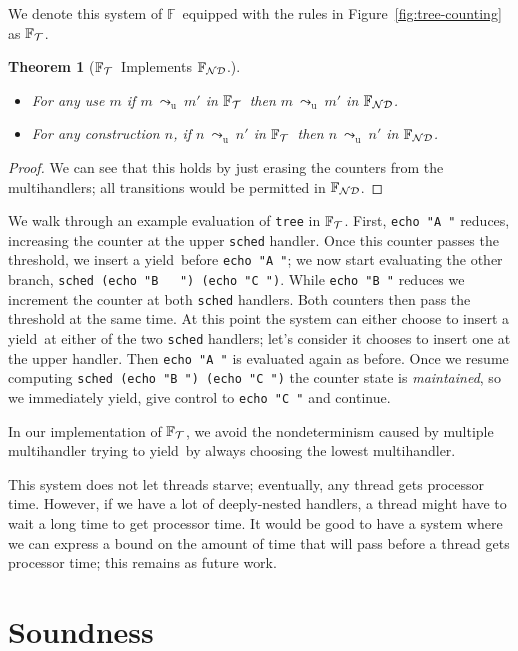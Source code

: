 \documentclass[msc,deptreport,cs]{infthesis} %
\newtheorem{theorem}{Theorem}
\newcommand{\code}[1]{\lstinline{#1}}
\newcommand\nondetfrank{$\mathbb{F}_{\cal{ND}}$}
\newcommand\treefrank{$\mathbb{F}_{\cal{T}}$}
\newcommand\purefrank{$\mathbb{F}$}
\newcommand\yield{\textsf{yield}\xspace}
\newcommand{\redtou}{\leadsto_{\mathrm{u}}}
\begin{document}
We denote this system of \purefrank~equipped with the rules in
Figure~\ref{fig:tree-counting} as \treefrank.

\begin{theorem}[\treefrank~Implements \nondetfrank.]~
\begin{itemize}
\item For any use $m$ if $m~\redtou~m'$ in \treefrank~then $m~\redtou~m'$ in
  \nondetfrank.
\item For any construction $n$, if $n~\redtou~n'$ in \treefrank~then
  $n~\redtou~n'$ in \nondetfrank.
\end{itemize}
\end{theorem}
\begin{proof}
  We can see that this holds by just erasing the counters from the
  multihandlers; all transitions would be permitted in \nondetfrank.
\end{proof}

We walk through an example evaluation of \code{tree} in \treefrank. First,
\code{echo "A "} reduces, increasing the counter at the upper \code{sched}
handler. Once this counter passes the threshold, we insert a \yield~before
\code{echo "A "}; we now start evaluating the other branch, \code{sched (echo "B
  ") (echo "C ")}. While \code{echo "B "} reduces we increment the counter at
both \code{sched} handlers. Both counters then pass the threshold at the same
time. At this point the system can either choose to insert a \yield~at either of
the two \code{sched} handlers; let's consider it chooses to insert one at the
upper handler. Then \code{echo "A "} is evaluated again as before. Once we
resume computing \code{sched (echo "B ") (echo "C ")} the counter state is
\emph{maintained}, so we immediately \yield, give control to \code{echo "C "}
and continue.

In our implementation of \treefrank, we avoid the nondeterminism caused by
multiple multihandler trying to \yield~by always choosing the lowest multihandler.

This system does not let threads starve; eventually, any thread gets processor
time. However, if we have a lot of deeply-nested handlers, a thread might have
to wait a long time to get processor time. It would be good to have a system
where we can express a bound on the amount of time that will pass before a
thread gets processor time; this remains as future work.

\section{Soundness}
\end{document}
